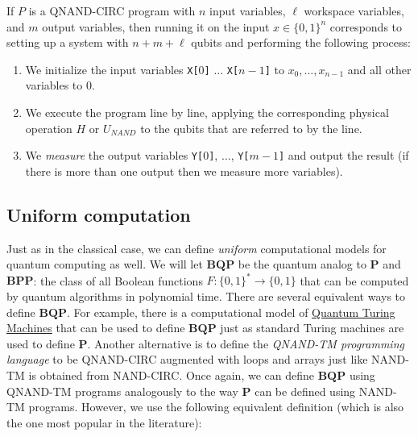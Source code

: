If \(P\) is a QNAND-CIRC program with \(n\) input variables, \(\ell\)
workspace variables, and \(m\) output variables, then running it on the
input \(x\in \{0,1\}^n\) corresponds to setting up a system with
\(n+m+\ell\) qubits and performing the following process:

\begin{enumerate}
\def\labelenumi{\arabic{enumi}.}
\item
  We initialize the input variables \texttt{X[}\(0\)\texttt{]}
  \(\ldots\) \texttt{X[}\(n-1\)\texttt{]} to \(x_0,\ldots,x_{n-1}\) and
  all other variables to \(0\).
\item
  We execute the program line by line, applying the corresponding
  physical operation \(H\) or \(U_{NAND}\) to the qubits that are
  referred to by the line.
\item
  We \emph{measure} the output variables \texttt{Y[}\(0\)\texttt{]},
  \(\ldots\), \texttt{Y[}\(m-1\)\texttt{]} and output the result (if
  there is more than one output then we measure more variables).
\end{enumerate}

\subsection{Uniform computation}\label{Uniform-computation}

Just as in the classical case, we can define \emph{uniform}
computational models for quantum computing as well. We will let
\(\mathbf{BQP}\) be the quantum analog to \(\mathbf{P}\) and
\(\mathbf{BPP}\): the class of all Boolean functions
\(F:\{0,1\}^* \rightarrow \{0,1\}\) that can be computed by quantum
algorithms in polynomial time. There are several equivalent ways to
define \(\mathbf{BQP}\). For example, there is a computational model of
\href{https://en.wikipedia.org/wiki/Quantum_Turing_machine}{Quantum
Turing Machines} that can be used to define \(\mathbf{BQP}\) just as
standard Turing machines are used to define \(\mathbf{P}\). Another
alternative is to define the \emph{QNAND-TM programming language} to be
QNAND-CIRC augmented with loops and arrays just like NAND-TM is obtained
from NAND-CIRC. Once again, we can define \(\mathbf{BQP}\) using
QNAND-TM programs analogously to the way \(\mathbf{P}\) can be defined
using NAND-TM programs. However, we use the following equivalent
definition (which is also the one most popular in the literature):

\hypertarget{BQPdef}{}

